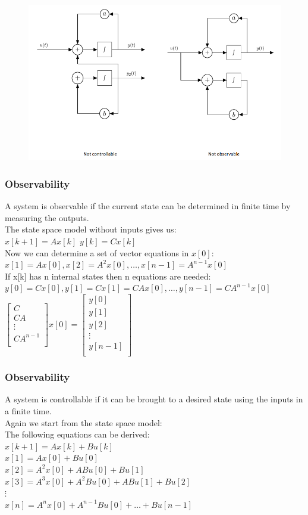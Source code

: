 \begin{frame}
	\begin{figure}
\centering
\includegraphics[width=0.7\linewidth]{Images/discrete_time_systems_34}
\caption{}
\label{fig:discrete_time_systems_34}
\end{figure}
\end{frame}
\begin{frame}
	\frametitle{Observability}
	A system is observable if the current state can be determined in finite time by measuring the outputs.\\
	The state space model without inputs gives us:\\
	$x[k+1] = A x[k] $ 				$y[k]=Cx[k]$\\
	Now we can determine a set of vector equations in $x[0]$:\\
	$x[1] = A x[0],x[2]  = A^2x[0],\dots , x[n-1] = A^{n-1} x[0]$\\
	If x[k] has n internal states then n equations are needed:\\
	$y[0] =Cx[0],y[1]=Cx[1]=CAx[0],\dots, y[n-1] = C A^{n-1} x[0]$\\
	$
	\begin{bmatrix}
		C\\
		CA\\
		\vdots\\
		CA^{n-1}\\
	\end{bmatrix}
	x[0]=
	\begin{bmatrix}
		y[0]\\
		y[1]\\
		y[2]\\
		\vdots \\
		y[n-1]\\
	\end{bmatrix}
	$
\end{frame}
\begin{frame}
	\frametitle{Observability}
	A system is controllable if it can be brought to a desired state using the inputs in a finite time.\\
	Again we start from the state space model:\\
	The following equations can be derived:\\
	$x[k+1] = A x[k] +Bu[k]$\\
	$x[1] = Ax[0]+Bu[0]$\\
	$x[2] = A^2 x[0] + ABu[0] + Bu[1]$\\
	$x[3] = A^3 x[0] + A^2Bu[0]+AB u[1] + Bu[2]$\\
	$\vdots$\\
	$x[n] = A^{n}x[0]+A^{n-1}Bu[0] + \dots + Bu[n-1]$
\end{frame}
